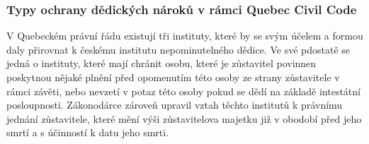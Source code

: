 \documentclass{article}
\begin{document}






\subsubsection{Typy ochrany dědických nároků v rámci Quebec Civil Code}

V Quebeckém právní řádu existují tři instituty, které by se svým účelem a formou daly přirovnat k českému institutu nepominutelného dědice. Ve své pdostatě se jedná o instituty, které mají chránit osobu, které je zůstavitel povinnen poskytnou nějaké plnění před opomenutím této osoby ze strany zůstavitele v rámci závěti, nebo nevzetí v potaz této osoby pokud se dědí na základě intestátní posloupnosti. Zákonodárce zároveň upravil vztah těchto institutů k právnímu jednání zůstavitele, které mění výši zůstavitelova majetku již v obodobí před jeho smrtí a s účinností k datu jeho smrti. \\

\vspace{5 mm}
\end{document}
